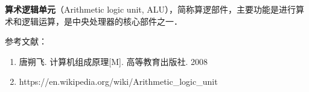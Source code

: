 
\textbf{算术逻辑单元}（Arithmetic logic unit, ALU），简称算逻部件，主要功能是进行算术和逻辑运算，是中央处理器的核心部件之一．



参考文献：
\begin{enumerate}
\item 唐朔飞. 计算机组成原理[M]. 高等教育出版社. 2008
\item https://en.wikipedia.org/wiki/Arithmetic_logic_unit
\end{enumerate}